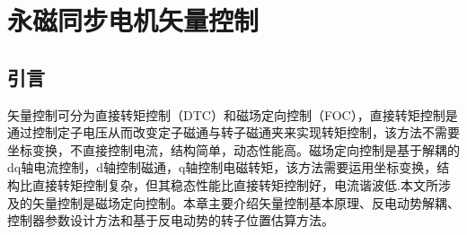 \chapter{永磁同步电机矢量控制}\label{ch:FOC}
\section{引言}
矢量控制可分为直接转矩控制（DTC）和磁场定向控制（FOC），直接转矩控制是通过控制定子电压从而改变定子磁通与转子磁通夹来实现转矩控制，该方法不需要坐标变换，不直接控制电流，结构简单，动态性能高。磁场定向控制是基于解耦的dq轴电流控制，d轴控制磁通，q轴控制电磁转矩，该方法需要运用坐标变换，结构比直接转矩控制复杂，但其稳态性能比直接转矩控制好，电流谐波低\cite{del2006comparison,__2008,casadei2002foc}.本文所涉及的矢量控制是磁场定向控制。本章主要介绍矢量控制基本原理、反电动势解耦、控制器参数设计方法和基于反电动势的转子位置估算方法。

